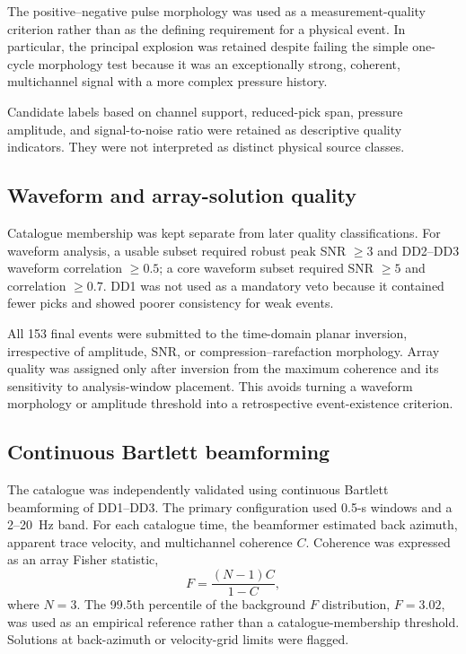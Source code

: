 \documentclass[]{seismica}
\begin{document}
The positive--negative pulse morphology was used as a measurement-quality criterion rather than as the defining requirement for a physical event. In particular, the principal explosion was retained despite failing the simple one-cycle morphology test because it was an exceptionally strong, coherent, multichannel signal with a more complex pressure history.

Candidate labels based on channel support, reduced-pick span, pressure amplitude, and signal-to-noise ratio were retained as descriptive quality indicators. They were not interpreted as distinct physical source classes.

\subsection{Waveform and array-solution quality}

Catalogue membership was kept separate from later quality classifications.
For waveform analysis, a usable subset required robust peak SNR $\geq3$ and
DD2--DD3 waveform correlation $\geq0.5$; a core waveform subset required SNR
$\geq5$ and correlation $\geq0.7$. DD1 was not used as a mandatory veto
because it contained fewer picks and showed poorer consistency for weak
events.

All 153 final events were submitted to the time-domain planar inversion,
irrespective of amplitude, SNR, or compression--rarefaction morphology. Array
quality was assigned only after inversion from the maximum coherence and its
sensitivity to analysis-window placement. This avoids turning a waveform
morphology or amplitude threshold into a retrospective event-existence
criterion.

\subsection{Continuous Bartlett beamforming}

The catalogue was independently validated using continuous Bartlett
beamforming of DD1--DD3. The primary configuration used 0.5-s windows and a
2--20~Hz band. For each catalogue time, the beamformer estimated back azimuth,
apparent trace velocity, and multichannel coherence $C$. Coherence was
expressed as an array Fisher statistic,
\begin{equation}
  F=\frac{(N-1)C}{1-C},
  \label{eq:f_statistic}
\end{equation}
where $N=3$. The 99.5th percentile of the background $F$ distribution,
$F=3.02$, was used as an empirical reference rather than a catalogue-membership
threshold. Solutions at back-azimuth or velocity-grid limits were flagged.
\end{document}
